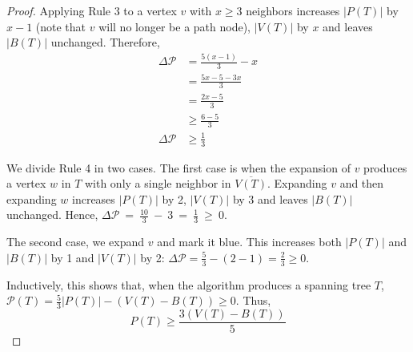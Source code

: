 \documentclass[12pt]{article}
\begin{document}
\begin{proof}
  Applying Rule 3 to a vertex $v$ with $x \ge 3$ neighbors increases $|P(T)|$ by $x - 1$ (note that $v$ will no longer be a path node), $|V(T)|$ by $x$ and leaves $|B(T)|$ unchanged.
  Therefore,
  \begin{align*}
    \Delta \mathcal{P} &= \frac{5(x - 1)}{3} - x \\
                       &= \frac{5x - 5 - 3x}{3} \\
                       &= \frac{2x - 5}{3} \\
                       &\ge \frac{6 - 5}{3} \\
    \Delta \mathcal{P} &\ge \frac{1}{3}
  \end{align*}

  We divide Rule 4 in two cases.
  The first case is when the expansion of $v$ produces a vertex $w$ in $T$ with only a single neighbor in $\overline{V(T)}$.
  Expanding $v$ and then expanding $w$ increases $|P(T)|$ by 2, $|V(T)|$ by 3 and leaves $|B(T)|$ unchanged.
  Hence, $\Delta \mathcal{P}~=~\frac{10}{3}~-~3~=~\frac{1}{3}~\ge~0$.

  The second case, we expand $v$ and mark it blue.
  This increases both $|P(T)|$ and $|B(T)|$ by 1 and $|V(T)|$ by 2: $\Delta \mathcal{P} = \frac{5}{3} - (2 - 1) = \frac{2}{3} \ge 0$.

  Inductively, this shows that, when the algorithm produces a spanning tree $T$, $\mathcal{P}(T) = \frac{5}{3}|P(T)| - (V(T) - B(T)) \ge 0$.
  Thus,
  $$ P(T) \ge \frac{3(V(T) - B(T))}{5} $$

\end{proof}
\end{document}
